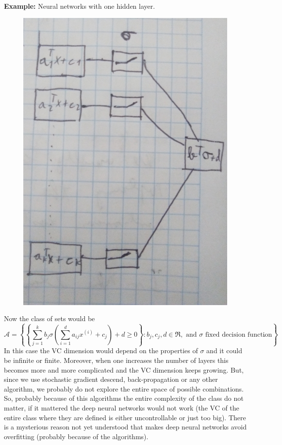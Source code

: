 \documentclass[11pt, english]{article}
\newcommand{\su}[2]{\sum\limits_{#1}^{#2}}
\begin{document}
\textbf{Example:} Neural networks with one hidden layer. 
\begin{figure}
	[h!tbp]
	\centering
	\includegraphics[scale=0.3]{neurnet.jpg}
\end{figure}
Now the class of sets would be 
\begin{equation}
	\mathcal{A}=\left\{\left\{\su{j=1}{k} b_j \sigma\left(\su{i=1}{d}a_{ij}x^{(i)}+c_j\right)+d\geq 0\right\}:b_j,c_j,d\in\Re,\text{ and }\sigma \text{ fixed decision function}\right\}.
\end{equation}
In this case the VC dimension would depend on the properties of $\sigma$ and it could be infinite or finite. Moreover, when one increases the number of layers this becomes more and more complicated and the VC dimension keeps growing. But, since we use stochastic gradient descend, back-propagation or any other algorithm, we probably do not explore the entire space of possible combinations. So, probably because of this algorithms the entire complexity of the class do not matter, if it mattered the deep neural networks would not work (the VC of the entire class where they are defined is either uncontrollable or just too big). There is a mysterious reason not yet understood that makes deep neural networks avoid overfitting (probably because of the algorithms).\\
\end{document}
